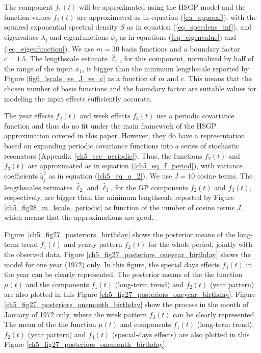 \documentclass[onecolumn,a4paper,11pt]{article}
\begin{document}
The component $f_1(t)$ will be approximated using the HSGP model and the function values $f_1(t)$ are approximated as in equation (\ref{eq_approxf}), with the squared exponential spectral density $S$ as in equation (\ref{eq_specdens_inf}), and eigenvalues $\lambda_j$ and eigenfunctions $\phi_j$ as in equations (\ref{eq_eigenvalue}) and (\ref{eq_eigenfunction}). We use $m=30$ basis functions and a boundary factor $c=1.5$. The lengthscale estimate $\hat{\ell}_1$, for this component, normalized by half of the range of the input $x_1$, is bigger than the minimum lengthscale reported by Figure \ref{fig6_lscale_vs_J_vs_c} as a function of $m$ and $c$. This means that the chosen number of basis functions and the boundary factor are suitable values for modeling the input effects sufficiently accurate. 

The year effects $f_2(t)$ and week effects $f_3(t)$ use a periodic covariance function  and thus do no fit under the main framework of the HSGP approximation covered in this paper. However, they do have a representation based on expanding periodic covariance functions into a series of stochastic resonators (Appendix~\ref{ch5_sec_periodic}). Thus, the functions $f_2(t)$ and $f_3(t)$ are approximated as in equation (\ref{ch5_eq_f_period}), with variance coefficients $\tilde{q}_j^2$ as in equation (\ref{ch5_eq_q_2}).
We use $J=10$ cosine terms. The lengthscales estimates $\hat{\ell}_2$ and $\hat{\ell}_3$, for the GP components $f_2(t)$ and $f_3(t)$, respectively, are bigger than the minimum lengthscale reported by Figure \ref{ch5_fig28_m_lscale_periodic} as function of the number of cosine terms $J$, which means that the approximations are good.

Figure~\ref{ch5_fig27_posteriors_birthday} shows the posterior means of the long-term trend $f_1(t)$ and yearly pattern $f_2(t)$ for the whole period, jointly with the observed data. Figure \ref{ch5_fig27_posteriors_oneyear_birthday} shows the model for one year (1972) only. In this figure, the special days effects $f_4(t)$ in the year can be clearly represented. The posterior means of the the function $\mu(t)$ and the components $f_1(t)$ (long-term trend) and $f_2(t)$ (year pattern) are also plotted in this Figure \ref{ch5_fig27_posteriors_oneyear_birthday}. Figure \ref{ch5_fig27_posteriors_onemonth_birthday} show the process in the month of January of 1972 only, where the week pattern $f_3(t)$ can be clearly represented. The mean of the the function $\mu(t)$ and components $f_1(t)$ (long-term trend), $f_2(t)$ (year pattern) and $f_4(t)$ (special-days effects) are also plotted in this Figure \ref{ch5_fig27_posteriors_onemonth_birthday}. 
\end{document}
